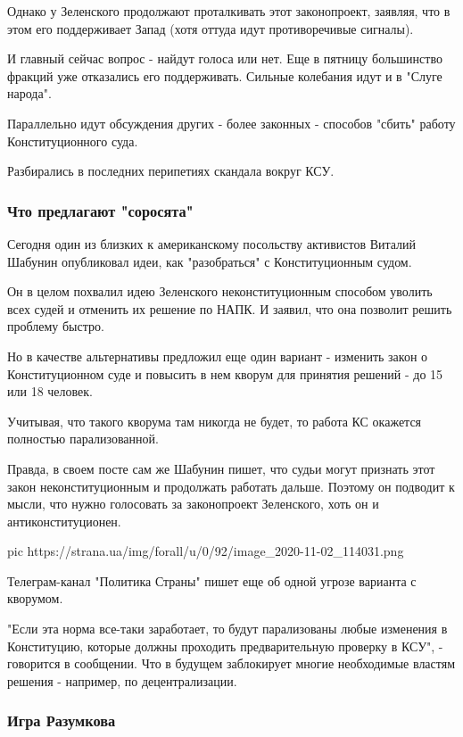 Однако у Зеленского продолжают проталкивать этот законопроект, заявляя, что в
этом его поддерживает Запад (хотя оттуда идут противоречивые сигналы). 

И главный сейчас вопрос - найдут голоса или нет. Еще в пятницу большинство
фракций уже отказались его поддерживать. Сильные колебания идут и в "Слуге
народа". 

Параллельно идут обсуждения других - более законных - способов "сбить" работу
Конституционного суда.

Разбирались в последних перипетиях скандала вокруг КСУ. 

\subsubsection{Что предлагают "соросята"}

Сегодня один из близких к американскому посольству активистов Виталий Шабунин
опубликовал идеи, как "разобраться" с Конституционным судом. 

Он в целом похвалил идею Зеленского неконституционным способом уволить всех
судей и отменить их решение по НАПК. И заявил, что она позволит решить проблему
быстро.

Но в качестве альтернативы предложил еще один вариант - изменить закон о
Конституционном суде и повысить в нем кворум для принятия решений - до 15 или
18 человек. 

Учитывая, что такого кворума там никогда не будет, то работа КС окажется
полностью парализованной. 

Правда, в своем посте сам же Шабунин пишет, что судьи могут признать этот закон
неконституционным и продолжать работать дальше. Поэтому он подводит к мысли,
что нужно голосовать за законопроект Зеленского, хоть он и антиконституционен.

\ifcmt
pic https://strana.ua/img/forall/u/0/92/image_2020-11-02_114031.png
\fi

Телеграм-канал "Политика Страны" пишет еще об одной угрозе варианта с кворумом.

"Если эта норма все-таки заработает, то будут парализованы любые изменения в
Конституцию, которые должны проходить предварительную проверку в КСУ", -
говорится в сообщении. Что в будущем заблокирует многие необходимые властям
решения - например, по децентрализации. 

\subsubsection{Игра Разумкова}

